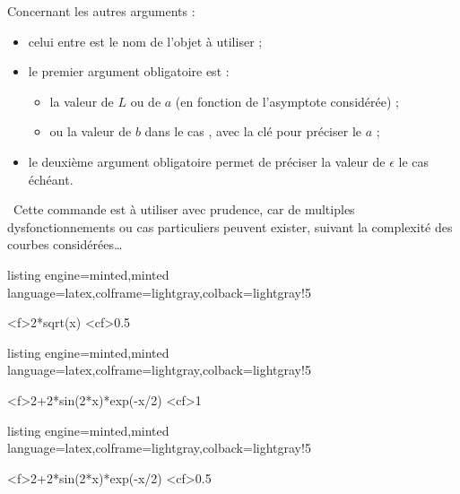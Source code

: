 \documentclass[11pt,a4paper]{ltxdoc}
\begin{document}
Concernant les autres arguments :

\begin{itemize}
  \item celui entre  est le nom de l'objet à utiliser ;
  \item le premier argument obligatoire est :
  \begin{itemize}
    \item la valeur de $L$ ou de $a$ (en fonction de l'asymptote considérée) ;
    \item ou la valeur de $b$ dans le cas , avec la clé  pour préciser le $a$ ;
  \end{itemize}
  \item le deuxième argument obligatoire permet de préciser la valeur de $\epsilon$ le cas échéant.
\end{itemize}

{\footnotesize\faBomb}~Cette commande est à utiliser avec prudence, car de multiples dysfonctionnements ou cas particuliers peuvent exister, suivant la complexité des courbes considérées\ldots

\begin{tcblisting}{listing engine=minted,minted language=latex,colframe=lightgray,colback=lightgray!5}
\begin{GraphiqueTikz}[Xmin=0,Xmax=4,Ymin=0,Ymax=5]
  \DefinirCourbe[Nom=cf, Trace, Couleur=red]<f>{2*sqrt(x)}
  \AfficherVoisinage%
    [TypeLimite={L en a}, LimiteEn=2, Couleur=green!50!black]%
    <cf>{}{0.5}
\end{GraphiqueTikz}
\end{tcblisting}

\begin{tcblisting}{listing engine=minted,minted language=latex,colframe=lightgray,colback=lightgray!5}
\begin{GraphiqueTikz}[Xmin=0,Xmax=4,Ymin=-1,Ymax=4]
  \DefinirCourbe[Nom=cf, Trace, Couleur=red]<f>{2+2*sin(2*x)*exp(-x/2)}
  \AfficherVoisinage%
    [TypeLimite={L en a}, LimiteEn=2]%
    <cf>{}{1}
\end{GraphiqueTikz}
\end{tcblisting}

\begin{tcblisting}{listing engine=minted,minted language=latex,colframe=lightgray,colback=lightgray!5}
\begin{GraphiqueTikz}[Xmin=0,Xmax=4,Ymin=-1,Ymax=4]
  \DefinirCourbe[Nom=cf, Trace, Couleur=red]<f>{2+2*sin(2*x)*exp(-x/2)}
  \AfficherVoisinage%
    [TypeLimite={L en a}, LimiteEn=2]%
    <cf>{}{0.5}
\end{GraphiqueTikz}
\end{tcblisting}
\end{document}
